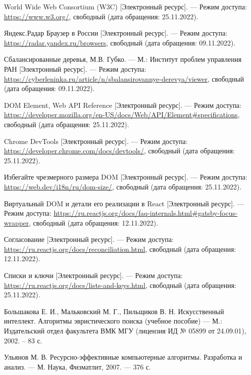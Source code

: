 \begin{thebibliography}{}
	World  Wide Web Consortium (W3C) [Электронный ресурс]. --- Режим доступа: \url{https://www.w3.org/}, свободный (дата обращения: 25.11.2022).
	
	Яндекс.Радар Браузер в России [Электронный ресурс]. --- Режим доступа:
	\url{https://radar.yandex.ru/browsers}, свободный (дата обращения: 09.11.2022).
	
	Сбалансированные деревья, М.В. Губко. --- М.: Институт проблем управления РАН [Электронный ресурс]. --- Режим доступа: \url{https://cyberleninka.ru/article/n/sbalansirovannye-derevya/viewer}, свободный (дата обращения: 09.11.2022).
	
	DOM Element, Web API Reference [Электронный ресурс]. --- Режим доступа: \url{https://developer.mozilla.org/en-US/docs/Web/API/Element#specifications}, свободный (дата обращения: 25.11.2022).
	
	Chrome DevTools [Электронный ресурс]. --- Режим доступа: \url{https://developer.chrome.com/docs/devtools/}, свободный (дата обращения: 25.11.2022).
	
	Избегайте чрезмерного размера DOM [Электронный ресурс]. --- Режим доступа: \url{https://web.dev/i18n/ru/dom-size/}, свободный (дата обращения: 25.11.2022).
	
	Виртуальный DOM и детали его реализации в React [Электронный ресурс]. --- Режим доступа: \url{https://ru.reactjs.org/docs/faq-internals.html#gatsby-focus-wrapper}, свободный (дата обращения: 12.11.2022).
	
	Согласование [Электронный ресурс]. --- Режим доступа: \url{https://ru.reactjs.org/docs/reconciliation.html}, свободный (дата обращения: 12.11.2022).
	
	Списки и ключи [Электронный ресурс]. --- Режим доступа: \url{https://ru.reactjs.org/docs/lists-and-keys.html}, свободный (дата обращения: 25.11.2022).
	
	Большакова Е. И., Мальковский М. Г., Пильщиков В. Н. Искусственный интеллект. Алгоритмы эвристического поиска (учебное пособие) --- М.: Издательский отдел факультета ВМК МГУ (лицензия ИД № 05899 от 24.09.01),
	2002. -- 83 с.
	
	Ульянов М. В. Ресурсно-эффективные компьютерные алгоритмы. Разработка и анализ. --- М. Наука, Физматлит, 2007. --- 376 с.
\end{thebibliography}
\endgroup

\pagebreak